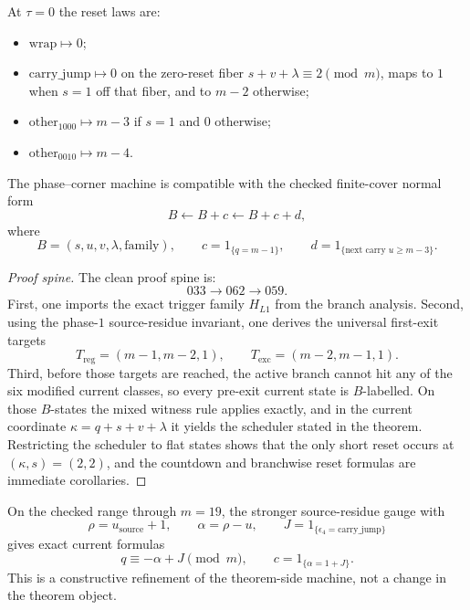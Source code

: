 \begin{corollary}
At $\tau=0$ the reset laws are:
\begin{itemize}
    \item $\mathrm{wrap}\mapsto 0$;
    \item $\mathrm{carry\_jump}\mapsto 0$ on the zero-reset fiber
    $s+v+\lambda\equiv 2\pmod m$, maps to $1$ when $s=1$ off that fiber, and to
    $m-2$ otherwise;
    \item $\mathrm{other}_{1000}\mapsto m-3$ if $s=1$ and $0$ otherwise;
    \item $\mathrm{other}_{0010}\mapsto m-4$.
\end{itemize}
\end{corollary}

\begin{corollary}
The phase--corner machine is compatible with the checked finite-cover normal
form
\[
B\leftarrow B+c\leftarrow B+c+d,
\]
where
\[
B=(s,u,v,\lambda,\mathrm{family}),
\qquad
c=1_{\{q=m-1\}},
\qquad
d=1_{\{\text{next carry }u\ge m-3\}}.
\]
\end{corollary}

\begin{proof}[Proof spine]
The clean proof spine is:
\[
033\to 062\to 059.
\]
First, one imports the exact trigger family $H_{L1}$ from the branch analysis.
Second, using the phase-$1$ source-residue invariant, one derives the
universal first-exit targets
\[
T_{\mathrm{reg}}=(m-1,m-2,1),
\qquad
T_{\mathrm{exc}}=(m-2,m-1,1).
\]
Third, before those targets are reached, the active branch cannot hit any of
the six modified current classes, so every pre-exit current state is
$B$-labelled. On those $B$-states the mixed witness rule applies exactly, and
in the current coordinate $\kappa=q+s+v+\lambda$ it yields the scheduler stated
in the theorem. Restricting the scheduler to flat states shows that the only
short reset occurs at $(\kappa,s)=(2,2)$, and the countdown and branchwise
reset formulas are immediate corollaries.
\end{proof}

\begin{remark}
On the checked range through $m=19$, the stronger source-residue gauge with
\[
\rho=u_{\mathrm{source}}+1,
\qquad
\alpha=\rho-u,
\qquad
J=1_{\{\epsilon_4=\mathrm{carry\_jump}\}}
\]
gives exact current formulas
\[
q\equiv -\alpha+J\pmod m,
\qquad
c=1_{\{\alpha=1+J\}}.
\]
This is a constructive refinement of the theorem-side machine, not a change in
the theorem object.
\end{remark}
